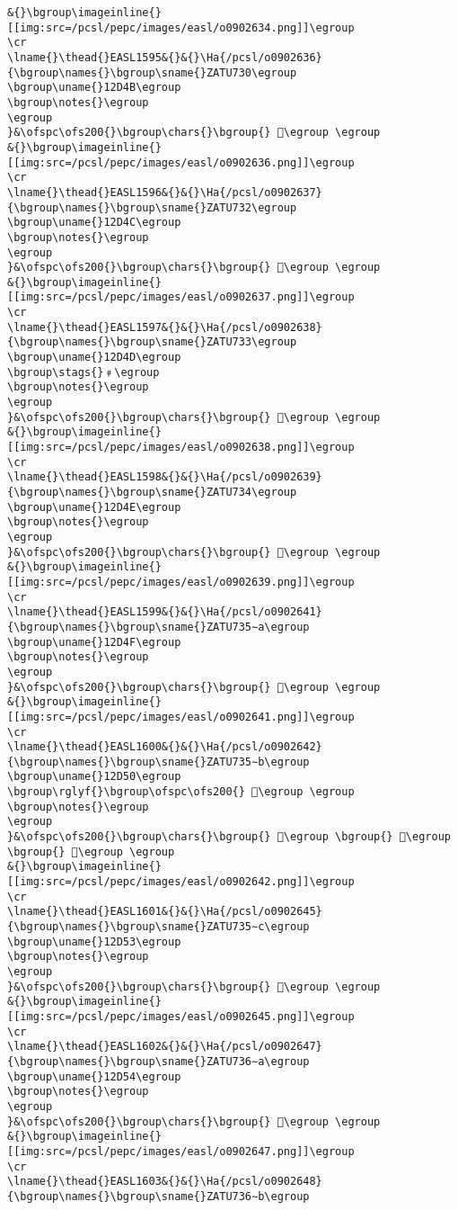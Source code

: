 \begin{verbatim}
&{}\bgroup\imageinline{}[[img:src=/pcsl/pepc/images/easl/o0902634.png]]\egroup
\cr
\lname{}\thead{}EASL1595&{}&{}\Ha{/pcsl/o0902636}{\bgroup\names{}\bgroup\sname{}ZATU730\egroup
\bgroup\uname{}12D4B\egroup
\bgroup\notes{}\egroup
\egroup
}&\ofspc\ofs200{}\bgroup\chars{}\bgroup{} 𒵋\egroup \egroup
&{}\bgroup\imageinline{}[[img:src=/pcsl/pepc/images/easl/o0902636.png]]\egroup
\cr
\lname{}\thead{}EASL1596&{}&{}\Ha{/pcsl/o0902637}{\bgroup\names{}\bgroup\sname{}ZATU732\egroup
\bgroup\uname{}12D4C\egroup
\bgroup\notes{}\egroup
\egroup
}&\ofspc\ofs200{}\bgroup\chars{}\bgroup{} 𒵌\egroup \egroup
&{}\bgroup\imageinline{}[[img:src=/pcsl/pepc/images/easl/o0902637.png]]\egroup
\cr
\lname{}\thead{}EASL1597&{}&{}\Ha{/pcsl/o0902638}{\bgroup\names{}\bgroup\sname{}ZATU733\egroup
\bgroup\uname{}12D4D\egroup
\bgroup\stags{}﹟\egroup
\bgroup\notes{}\egroup
\egroup
}&\ofspc\ofs200{}\bgroup\chars{}\bgroup{} 𒵍\egroup \egroup
&{}\bgroup\imageinline{}[[img:src=/pcsl/pepc/images/easl/o0902638.png]]\egroup
\cr
\lname{}\thead{}EASL1598&{}&{}\Ha{/pcsl/o0902639}{\bgroup\names{}\bgroup\sname{}ZATU734\egroup
\bgroup\uname{}12D4E\egroup
\bgroup\notes{}\egroup
\egroup
}&\ofspc\ofs200{}\bgroup\chars{}\bgroup{} 𒵎\egroup \egroup
&{}\bgroup\imageinline{}[[img:src=/pcsl/pepc/images/easl/o0902639.png]]\egroup
\cr
\lname{}\thead{}EASL1599&{}&{}\Ha{/pcsl/o0902641}{\bgroup\names{}\bgroup\sname{}ZATU735∼a\egroup
\bgroup\uname{}12D4F\egroup
\bgroup\notes{}\egroup
\egroup
}&\ofspc\ofs200{}\bgroup\chars{}\bgroup{} 𒵏\egroup \egroup
&{}\bgroup\imageinline{}[[img:src=/pcsl/pepc/images/easl/o0902641.png]]\egroup
\cr
\lname{}\thead{}EASL1600&{}&{}\Ha{/pcsl/o0902642}{\bgroup\names{}\bgroup\sname{}ZATU735∼b\egroup
\bgroup\uname{}12D50\egroup
\bgroup\rglyf{}\bgroup\ofspc\ofs200{} 𒵐\egroup \egroup
\bgroup\notes{}\egroup
\egroup
}&\ofspc\ofs200{}\bgroup\chars{}\bgroup{} 𒵒\egroup \bgroup{} 𒵐\egroup \bgroup{} 𒵑\egroup \egroup
&{}\bgroup\imageinline{}[[img:src=/pcsl/pepc/images/easl/o0902642.png]]\egroup
\cr
\lname{}\thead{}EASL1601&{}&{}\Ha{/pcsl/o0902645}{\bgroup\names{}\bgroup\sname{}ZATU735∼c\egroup
\bgroup\uname{}12D53\egroup
\bgroup\notes{}\egroup
\egroup
}&\ofspc\ofs200{}\bgroup\chars{}\bgroup{} 𒵓\egroup \egroup
&{}\bgroup\imageinline{}[[img:src=/pcsl/pepc/images/easl/o0902645.png]]\egroup
\cr
\lname{}\thead{}EASL1602&{}&{}\Ha{/pcsl/o0902647}{\bgroup\names{}\bgroup\sname{}ZATU736∼a\egroup
\bgroup\uname{}12D54\egroup
\bgroup\notes{}\egroup
\egroup
}&\ofspc\ofs200{}\bgroup\chars{}\bgroup{} 𒵔\egroup \egroup
&{}\bgroup\imageinline{}[[img:src=/pcsl/pepc/images/easl/o0902647.png]]\egroup
\cr
\lname{}\thead{}EASL1603&{}&{}\Ha{/pcsl/o0902648}{\bgroup\names{}\bgroup\sname{}ZATU736∼b\egroup

\end{verbatim}
